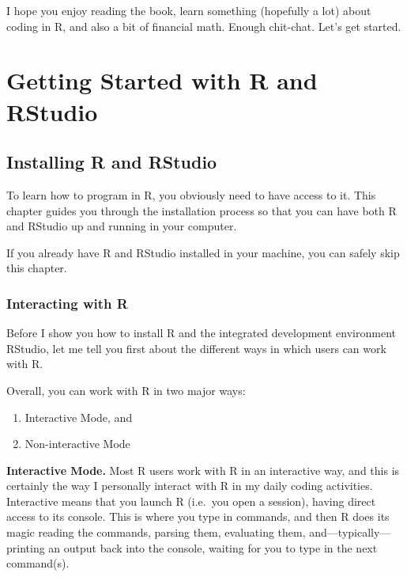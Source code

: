 \documentclass[
]{book}
\begin{document}
I hope you enjoy reading the book, learn something (hopefully a lot) about
coding in R, and also a bit of financial math. Enough chit-chat.
Let's get started.

\hypertarget{part-getting-started-with-r-and-rstudio}{%
\part{Getting Started with R and RStudio}\label{part-getting-started-with-r-and-rstudio}}

\hypertarget{install}{%
\chapter{Installing R and RStudio}\label{install}}

To learn how to program in R, you obviously need to have access to it. This
chapter guides you through the installation process so that you can have both R
and RStudio up and running in your computer.

If you already have R and RStudio installed in your machine, you can safely
skip this chapter.

\hypertarget{interacting-with-r}{%
\section{Interacting with R}\label{interacting-with-r}}

Before I show you how to install R and the integrated development environment
RStudio, let me tell you first about the different ways in which users can
work with R.

Overall, you can work with R in two major ways:

\begin{enumerate}
\def\labelenumi{\arabic{enumi})}
\item
  Interactive Mode, and
\item
  Non-interactive Mode
\end{enumerate}

\textbf{Interactive Mode.} Most R users work with R in an interactive way, and this
is certainly the way I personally interact with R in my daily coding activities.
Interactive means that you launch R (i.e.~you open a session), having direct
access to its console. This is where you type in commands, and then R does its
magic reading the commands, parsing them, evaluating them,
and---typically---printing an output back into the console, waiting for you to
type in the next command(s).
\end{document}
